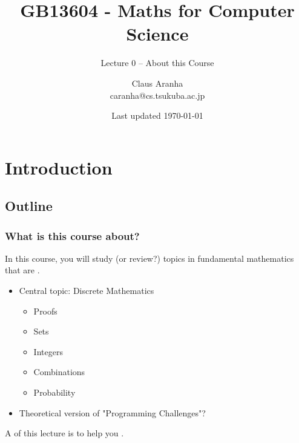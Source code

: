 \documentclass[aspectratio=169]{beamer}
\title[GB13604]{GB13604 - Maths for Computer Science}
\subtitle[]{Lecture 0 -- About this Course}
\author[Claus Aranha]{Claus Aranha\\{\footnotesize caranha@cs.tsukuba.ac.jp}}
\institute[COINS]{College of Information Science}
\date[]{{\tiny Last updated \today}}
\begin{document}
\section{Introduction}
\subsection{Outline}

\begin{frame}
  \maketitle
\end{frame}

\begin{frame}
  \frametitle{What is this course about?}

  In this course, you will study (or review?) topics in fundamental mathematics that are .

  \vfill

  \begin{itemize}
  \item Central topic: Discrete Mathematics
    \begin{itemize}
    \item Proofs
    \item Sets
    \item Integers
    \item Combinations
    \item Probability
    \end{itemize}
  \bigskip

  \item Theoretical version of "Programming Challenges"?
  \end{itemize}


  \bigskip

  A  of this lecture is to help you .
\end{frame}
\end{document}
